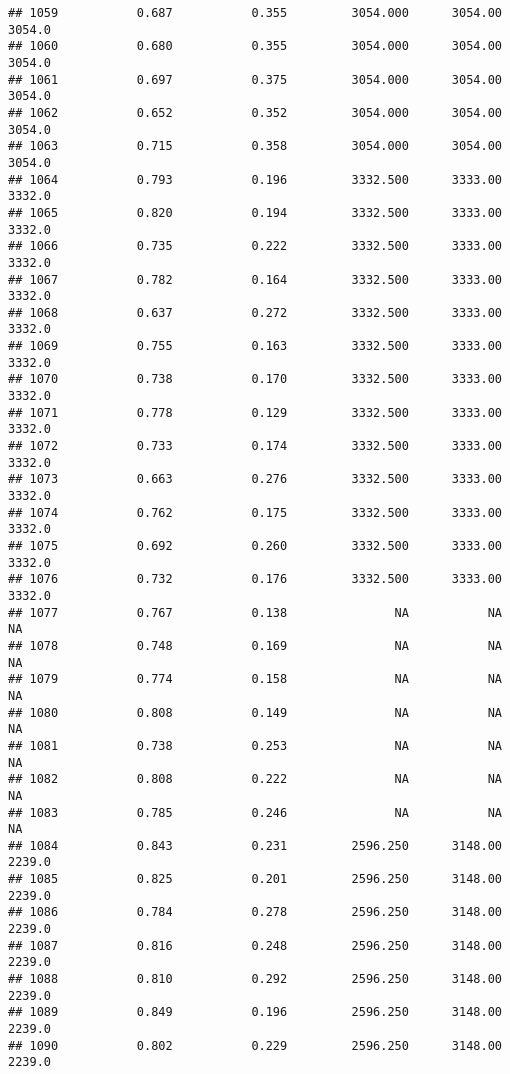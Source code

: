 \documentclass[
]{article}
\begin{document}
\begin{verbatim}
## 1059           0.687           0.355         3054.000      3054.00       3054.0
## 1060           0.680           0.355         3054.000      3054.00       3054.0
## 1061           0.697           0.375         3054.000      3054.00       3054.0
## 1062           0.652           0.352         3054.000      3054.00       3054.0
## 1063           0.715           0.358         3054.000      3054.00       3054.0
## 1064           0.793           0.196         3332.500      3333.00       3332.0
## 1065           0.820           0.194         3332.500      3333.00       3332.0
## 1066           0.735           0.222         3332.500      3333.00       3332.0
## 1067           0.782           0.164         3332.500      3333.00       3332.0
## 1068           0.637           0.272         3332.500      3333.00       3332.0
## 1069           0.755           0.163         3332.500      3333.00       3332.0
## 1070           0.738           0.170         3332.500      3333.00       3332.0
## 1071           0.778           0.129         3332.500      3333.00       3332.0
## 1072           0.733           0.174         3332.500      3333.00       3332.0
## 1073           0.663           0.276         3332.500      3333.00       3332.0
## 1074           0.762           0.175         3332.500      3333.00       3332.0
## 1075           0.692           0.260         3332.500      3333.00       3332.0
## 1076           0.732           0.176         3332.500      3333.00       3332.0
## 1077           0.767           0.138               NA           NA           NA
## 1078           0.748           0.169               NA           NA           NA
## 1079           0.774           0.158               NA           NA           NA
## 1080           0.808           0.149               NA           NA           NA
## 1081           0.738           0.253               NA           NA           NA
## 1082           0.808           0.222               NA           NA           NA
## 1083           0.785           0.246               NA           NA           NA
## 1084           0.843           0.231         2596.250      3148.00       2239.0
## 1085           0.825           0.201         2596.250      3148.00       2239.0
## 1086           0.784           0.278         2596.250      3148.00       2239.0
## 1087           0.816           0.248         2596.250      3148.00       2239.0
## 1088           0.810           0.292         2596.250      3148.00       2239.0
## 1089           0.849           0.196         2596.250      3148.00       2239.0
## 1090           0.802           0.229         2596.250      3148.00       2239.0

\end{verbatim}
\end{document}
